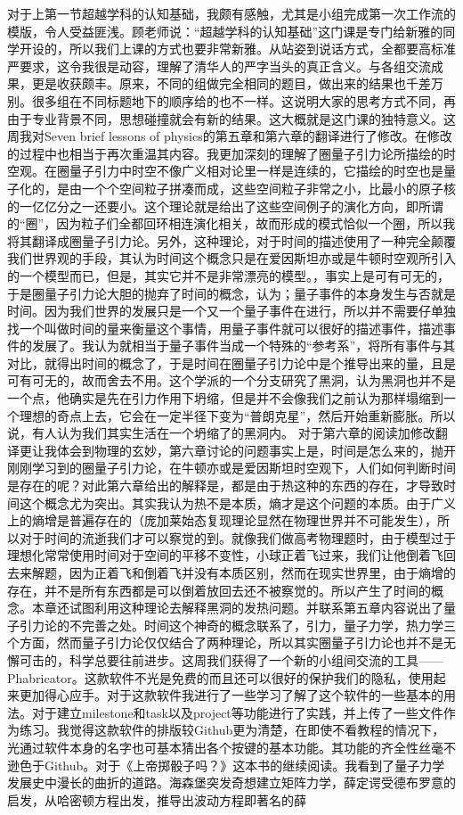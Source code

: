\documentclass[11pt,fleqn]{book}
\numberwithin{dummy}{section}
\theoremstyle{ocrenumbox}
\theoremstyle{blacknumex}
\theoremstyle{blacknumbox}
\theoremstyle{ocrenum}
\newenvironment{remark}[1]{\par\vspace{10pt}\small %
	\begin{list}{}{
			\leftmargin=35pt %
			\rightmargin=25pt}\item\ignorespaces %
		\makebox[-2.5pt]{\begin{tikzpicture}[overlay]
			\node[draw=ocre!60,line width=1pt,circle,fill=ocre!25,font=\sffamily\bfseries,inner sep=2pt,outer sep=0pt] at (-15pt,0pt){\textcolor{ocre}{#1}};\end{tikzpicture}} %
		\advance\baselineskip -1pt}{\end{list}\vskip5pt} %
\newlength\esp
\begin{document}
\begin{remark}{刘}
	对于上第一节超越学科的认知基础，我颇有感触，尤其是小组完成第一次工作流的模版，令人受益匪浅。顾老师说：“超越学科的认知基础”这门课是专门给新雅的同学开设的，所以我们上课的方式也要非常新雅。从站姿到说话方式，全都要高标准严要求，这令我很是动容，理解了清华人的严字当头的真正含义。与各组交流成果，更是收获颇丰。原来，不同的组做完全相同的题目，做出来的结果也千差万别。很多组在不同标题地下的顺序给的也不一样。这说明大家的思考方式不同，再由于专业背景不同，思想碰撞就会有新的结果。这大概就是这门课的独特意义。这周我对Seven brief lessons of physics的第五章和第六章的翻译进行了修改。在修改的过程中也相当于再次重温其内容。我更加深刻的理解了圈量子引力论所描绘的时空观。在圈量子引力中时空不像广义相对论里一样是连续的，它描绘的时空也是量子化的，是由一个个空间粒子拼凑而成，这些空间粒子非常之小，比最小的原子核的一亿亿分之一还要小。这个理论就是给出了这些空间例子的演化方向，即所谓的“圈”，因为粒子们全都回环相连演化相关，故而形成的模式恰似一个圈，所以我将其翻译成圈量子引力论。另外，这种理论，对于时间的描述使用了一种完全颠覆我们世界观的手段，其认为时间这个概念只是在爱因斯坦亦或是牛顿时空观所引入的一个模型而已，但是，其实它并不是非常漂亮的模型。，事实上是可有可无的，于是圈量子引力论大胆的抛弃了时间的概念，认为；量子事件的本身发生与否就是时间。因为我们世界的发展只是一个又一个量子事件在进行，所以并不需要仔单独找一个叫做时间的量来衡量这个事情，用量子事件就可以很好的描述事件，描述事件的发展了。我认为就相当于量子事件当成一个特殊的“参考系”，将所有事件与其对比，就得出时间的概念了，于是时间在圈量子引力论中是个推导出来的量，且是可有可无的，故而舍去不用。这个学派的一个分支研究了黑洞，认为黑洞也并不是一个点，他确实是先在引力作用下坍缩，但是并不会像我们之前认为那样塌缩到一个理想的奇点上去，它会在一定半径下变为“普朗克星”，然后开始重新膨胀。所以说，有人认为我们其实生活在一个坍缩了的黑洞内。	对于第六章的阅读加修改翻译更让我体会到物理的玄妙，第六章讨论的问题事实上是，时间是怎么来的，抛开刚刚学习到的圈量子引力论，在牛顿亦或是爱因斯坦时空观下，人们如何判断时间是存在的呢？对此第六章给出的解释是，都是由于热这种的东西的存在，才导致时间这个概念尤为突出。其实我认为热不是本质，熵才是这个问题的本质。由于广义上的熵增是普遍存在的（庞加莱始态复现理论显然在物理世界并不可能发生），所以对于时间的流逝我们才可以察觉的到。就像我们做高考物理题时，由于模型过于理想化常常使用时间对于空间的平移不变性，小球正着飞过来，我们让他倒着飞回去来解题，因为正着飞和倒着飞并没有本质区别，然而在现实世界里，由于熵增的存在，并不是所有东西都是可以倒着放回去还不被察觉的。所以产生了时间的概念。本章还试图利用这种理论去解释黑洞的发热问题。并联系第五章内容说出了量子引力论的不完善之处。时间这个神奇的概念联系了，引力，量子力学，热力学三个方面，然而量子引力论仅仅结合了两种理论，所以其实圈量子引力论也并不是无懈可击的，科学总要往前进步。这周我们获得了一个新的小组间交流的工具——Phabricator。这款软件不光是免费的而且还可以很好的保护我们的隐私，使用起来更加得心应手。对于这款软件我进行了一些学习了解了这个软件的一些基本的用法。对于建立milestone和task以及project等功能进行了实践，并上传了一些文件作为练习。我觉得这款软件的排版较Github更为清楚，在即使不看教程的情况下，光通过软件本身的名字也可基本猜出各个按键的基本功能。其功能的齐全性丝毫不逊色于Github。对于《上帝掷骰子吗？》这本书的继续阅读。我看到了量子力学发展史中漫长的曲折的道路。海森堡突发奇想建立矩阵力学，薛定谔受德布罗意的启发，从哈密顿方程出发，推导出波动方程即著名的薛
\end{remark}
\end{document}
